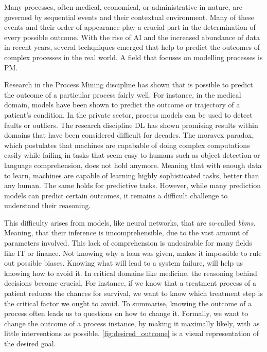 \documentclass[./../../paper.tex]{subfiles}
\begin{document}
Many processes, often medical, economical, or administrative in nature, are governed by sequential events and their contextual environment. Many of these events and their order of appearance play a crucial part in the determination of every possible outcome\needscite{}. With the rise of AI and the increased abundance of data in recent years, several techqniques emerged that help to predict the outcomes of complex processes in the real world. A field that focuses on modelling processes is \gls{PM}.

Research in the Process Mining discipline has shown that is possible to predict the outcome of a particular process fairly well\needscite{}. 
For instance, in the medical domain, models have been shown to predict the outcome or trajectory of a patient's condition\needscite{}. In the private sector, process models can be used to detect faults or outliers. The research discipline \gls{DL} has shown promising results within domains that have been considered difficult for decades. The moravex paradox, which postulates that machines are capabable of doing complex computations easily while failing in tasks that seem easy to humans such as object detection or language comprehension, does not hold anymore. Meaning that with enough data to learn, machines are capable of learning highly sophisticated tasks, better than any human. The same holds for predictive tasks. However, while many prediction models can predict certain outcomes, it remains a difficult challenge to understand their reasoning. 

This difficulty arises from models, like neural networks, that are so-called \emph{\glspl{bbm}}. Meaning, that their inference is imcomprehensible, due to the vast amount of parameters involved. This lack of comprehension is undesirable for many fields like IT or finance. Not knowing why a loan was given, makes it impossible to rule out possible biases. Knowing what will lead to a system failure, will help us knowing how to avoid it. In critical domains like medicine, the reasoning behind decisions become crucial. For instance, if we know that a treatment process of a patient reduces the chances for survival, we want to know which treatment step is the critical factor we ought to avoid. To summarise, knowing the outcome of a process often leads us to questions on how to change it. Formally, we want to change the outcome of a process instance, by making it maximally likely, with as little interventions as possible\needscite{}. \autoref{fig:desired_outcome} is a visual representation of the desired goal.
\end{document}
